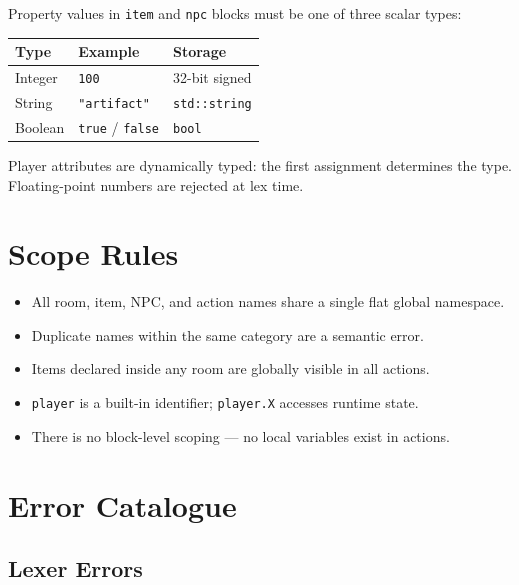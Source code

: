 \documentclass[12pt, a4paper]{article}
\begin{document}
Property values in \texttt{item} and \texttt{npc} blocks must be one of three scalar types:

\begin{center}
\begin{tabular}{lll}
\toprule
\textbf{Type} & \textbf{Example} & \textbf{Storage} \\
\midrule
Integer & \texttt{100} & 32-bit signed \\
String & \texttt{"artifact"} & \texttt{std::string} \\
Boolean & \texttt{true} / \texttt{false} & \texttt{bool} \\
\bottomrule
\end{tabular}
\end{center}

Player attributes are dynamically typed: the first assignment determines the type.
Floating-point numbers are rejected at lex time.

\section{Scope Rules}

\begin{itemize}
  \item All room, item, NPC, and action names share a single flat global namespace.
  \item Duplicate names within the same category are a semantic error.
  \item Items declared inside any room are globally visible in all actions.
  \item \texttt{player} is a built-in identifier; \texttt{player.X} accesses runtime state.
  \item There is no block-level scoping — no local variables exist in actions.
\end{itemize}

\section{Error Catalogue}

\subsection{Lexer Errors}
\end{document}
